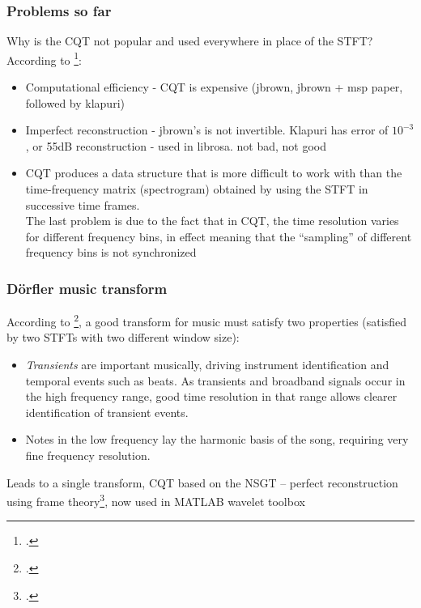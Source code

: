 \documentclass[usenames,dvipsnames]{beamer}
\begin{document}
\begin{frame}
	\frametitle{Problems so far}
	Why is the CQT not popular and used everywhere in place of the STFT? According to \footcite{klapuricqt}:
	\begin{itemize}
		\item
			Computational efficiency - CQT is expensive (jbrown, jbrown + msp paper, followed by klapuri)
		\item
			Imperfect reconstruction - jbrown's is not invertible. Klapuri has error of $10^{-3}$, or 55dB reconstruction - used in librosa. not bad, not good
		\item
			CQT produces a data structure that is more difficult to work with than the time-frequency matrix (spectrogram) obtained by using the STFT in successive time frames.\\
			The last problem is due to the fact that in CQT, the time resolution varies for different frequency bins, in effect meaning that the ``sampling'' of different frequency bins is not synchronized
	\end{itemize}
\end{frame}

\begin{frame}
	\frametitle{D{\"o}rfler music transform}
	According to \footcite{doerflerphd}, a good transform for music must satisfy two properties (satisfied by two STFTs with two different window size):
\begin{itemize}
	\item
		\textit{Transients} are important musically, driving instrument identification and temporal events such as beats. As transients and broadband signals occur in the high frequency range, good time resolution in that range allows clearer identification of transient events.
	\item
		 Notes in the low frequency lay the harmonic basis of the song, requiring very fine frequency resolution.
\end{itemize}
	Leads to a single transform, CQT based on the NSGT -- perfect reconstruction using frame theory\footcite{balazs, invertiblecqt}, now used in MATLAB wavelet toolbox
\end{frame}
\end{document}
